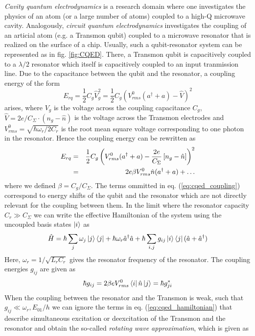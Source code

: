{\it Cavity quantum electrodynamics} is a research domain where one investigates the physics of an atom (or a large number of atoms) coupled to a high-Q microwave cavity. Analogously, {\it circuit quantum electrodynamics} investigates the coupling of an articial atom (e.g. a Transmon qubit) coupled to a microwave resonator that is realized on the surface of a chip. Usually, such a qubit-resonator system can be represented as in fig. \ref{fig:CQED}. There, a Transmon qubit is capacitively coupled to a $\lambda/2$ resonator which itself is capacitively coupled to an input tranmission line. Due to the capacitance between the qubit and the resonator, a coupling energy of the form
%
\begin{equation}
E_{rq} = \frac{1}{2}C_{g}\hat{V}_g^2 = \frac{1}{2}C_g\left(V^0_{rms}(a^\dagger+a)-\hat{V}\right)^2
\end{equation}
%
arises, where $V_g$ is the voltage across the coupling capacitance $C_g$, $\hat{V}=2e/C_\Sigma \cdot(n_g-\hat{n})$ is the voltage across the Transmon electrodes and $V^0_{rms} = \sqrt{\hbar \omega_r/2C_r}$ is the root mean square voltage corresponding to one photon in the resonator. Hence the coupling energy can be rewritten as
%
\begin{eqnarray}
E_{rq} & = & \frac{1}{2}C_g\left(V_{rms}^0(a^\dagger+a)-\frac{2e}{C_\Sigma}\left[n_g-\hat{n}\right]\right)^2 \notag \\
       & = & 2e \beta V_{rms}^0\hat{n}(a^\dagger+a) + \hdots \label{eq:cqed_coupling}
\end{eqnarray}
%
where we defined $\beta = C_g/C_\Sigma$. The terms ommitted in eq. (\ref{eq:cqed_coupling}) correspond to energy shifts of the qubit and the resonator which are not directly relevant for the coupling between them. 
 In the limit where the resonator capacity $C_r \gg C_\Sigma$ we can write the effective Hamiltonian of the system using the uncoupled basis states $\left| i \right>$ as
%
\begin{equation}
\hat{H} = \hbar \sum\limits_j \omega_j \left| j \right>\left< j \right| + \hbar \omega_r \hat{a}^\dagger \hat{a} + \hbar \sum\limits_{i,j} g_{ij} \left| i \right>\left< j \right|(\hat{a}+\hat{a}^\dagger) \label{eq:cqed_hamiltonian}
\end{equation}
%
Here, $\omega_r = 1/\sqrt{L_r C_r}$ gives the resonator frequency of the resonator. The coupling energies $g_{ij}$ are given as
%
\begin{equation}
\hbar g_{ij} = 2\beta e V_{rms}^0 \left< i \right|\hat{n}\left| j \right> = \hbar g_{ji}^*
\end{equation}
%
When the coupling between the resonator and the Transmon is weak, such that $g_{ij} \ll \omega_r,E_{01}/h$ we can ignore the terms in eq. (\ref{eq:cqed_hamiltonian}) that describe simultaneous excitation or deexcitation of the Transmon and the resonator and obtain the so-called {\it rotating wave approximation}, which is given as
